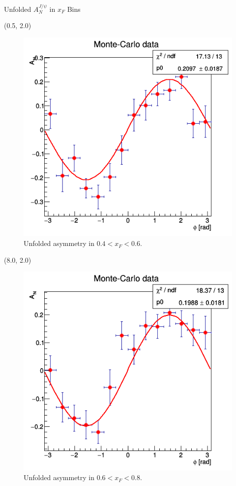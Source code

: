 \documentclass[10pt, xcolor={dvipsnames}, aspectratio = 169]{beamer}
\begin{document}
\begin{frame}{Unfolded $A^{J/\psi}_{N}$ in $x_{F}$ Bins}

\begin{textblock}{7.0}(0.5, 2.0)
\begin{figure}
    \centering
    \includegraphics[width = 1.0\linewidth]{imgs/sigal_asym_xf0.png}
    \caption{Unfolded asymmetry in $0.4 < x_{F} < 0.6$.}
\end{figure}
\end{textblock}

\begin{textblock}{7.0}(8.0, 2.0)
\begin{figure}
    \centering
    \includegraphics[width = 1.0\linewidth]{imgs/sigal_asym_xf1.png}
    \caption{Unfolded asymmetry in $0.6 < x_{F} < 0.8$.}
\end{figure}
\end{textblock}

\end{frame}
\end{document}

